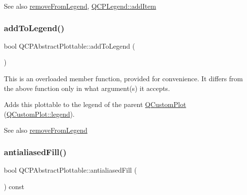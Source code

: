 \begin{DoxySeeAlso}{See also}
\mbox{\hyperlink{class_q_c_p_abstract_plottable_a3cc235007e2343a65ad4f463767e0e20}{remove\+From\+Legend}}, \mbox{\hyperlink{class_q_c_p_legend_a3ab274de52d2951faea45a6d975e6b3f}{Q\+C\+P\+Legend\+::add\+Item}} 
\end{DoxySeeAlso}
\mbox{\label{class_q_c_p_abstract_plottable_a70f8cabfd808f7d5204b9f18c45c13f5}} 
\subsubsection{\texorpdfstring{addToLegend()}{addToLegend()}\hspace{0.1cm}{\footnotesize\ttfamily [2/2]}}
{\footnotesize\ttfamily bool Q\+C\+P\+Abstract\+Plottable\+::add\+To\+Legend (\begin{DoxyParamCaption}{ }\end{DoxyParamCaption})}

This is an overloaded member function, provided for convenience. It differs from the above function only in what argument(s) it accepts.

Adds this plottable to the legend of the parent \mbox{\hyperlink{class_q_custom_plot}{Q\+Custom\+Plot}} (\mbox{\hyperlink{class_q_custom_plot_a4eadcd237dc6a09938b68b16877fa6af}{Q\+Custom\+Plot\+::legend}}).

\begin{DoxySeeAlso}{See also}
\mbox{\hyperlink{class_q_c_p_abstract_plottable_a3cc235007e2343a65ad4f463767e0e20}{remove\+From\+Legend}} 
\end{DoxySeeAlso}
\mbox{\label{class_q_c_p_abstract_plottable_a022717896dc57b638a7b5a7be7212ba9}} 
\subsubsection{\texorpdfstring{antialiasedFill()}{antialiasedFill()}}
{\footnotesize\ttfamily bool Q\+C\+P\+Abstract\+Plottable\+::antialiased\+Fill (\begin{DoxyParamCaption}{ }\end{DoxyParamCaption}) const\hspace{0.3cm}{\ttfamily [inline]}}

